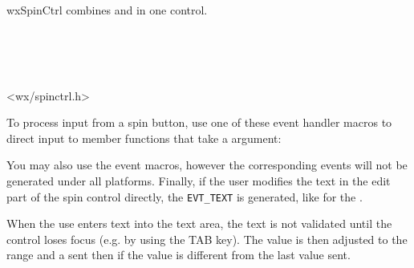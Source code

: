 %
%

\section{}\label{wxspinctrl}

wxSpinCtrl combines  and 
 in one control.


\\
\\
\\


<wx/spinctrl.h>




\twocolwidtha{5cm}
\begin{twocollist}\itemsep=0pt
\end{twocollist}


To process input from a spin button, use one of these event handler macros to direct input to member
functions that take a  argument:

\twocolwidtha{7cm}
\begin{twocollist}\itemsep=0pt
\end{twocollist}%

You may also use the  event macros, however
the corresponding events will not be generated under all platforms. Finally, if
the user modifies the text in the edit part of the spin control directly, the
{\tt EVT\_TEXT} is generated, like for the .

When the use enters text into the text area, the text is not
validated until the control loses focus (e.g. by using the TAB
key). The value is then adjusted to the range and a 
 sent then if the value
is different from the last value sent.

